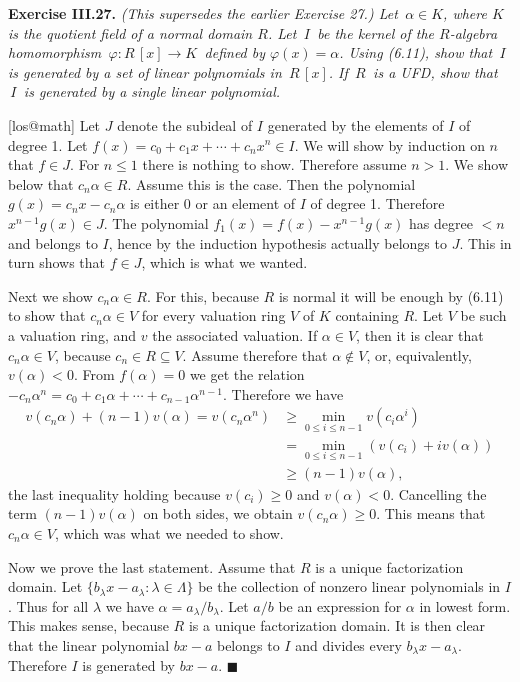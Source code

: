 \documentclass{article}
\makeatletter
\newcommand\<{\triangleleft}
\newenvironment{exercise}[1]{\gdef\currentEx{#1}\begin{trivlist}\item[]%
                \textbf{Exercise #1.} \it}{\end{trivlist}}
\newenvironment{solution}[1]{\def\x{#1}\begin{trivlist}\item[]\hspace*{-.5em}[\x]}
                {\hspace*{\fill} $\blacksquare$
                \protected@write0{}{\currentEx, \x}
                \end{trivlist}}
\makeatother
\begin{document}
 \begin{exercise}{III.27}
   (This supersedes the earlier Exercise 27.) Let $\,\alpha\in K$, where $K$ is the
   quotient field of a normal domain $R$. Let $\,I\,$ be the kernel of the $R$-algebra
   homomorphism $\,\varphi:R\,[x]\rightarrow K\,$ defined by $\varphi(x) =\alpha$.  Using
   (6.11), show that $\,I\,$ is generated by a set of linear polynomials in $\,R\,[x]$.
   If $\,R\,$ is a UFD, show that $\,I\,$ is generated by a single linear polynomial.
 \end{exercise}
 \begin{solution}{los@math}
   Let $J$ denote the subideal of $I$ generated by the elements of $I$ of degree 1. Let
   $f(x) = c_0 + c_1x + \cdots + c_nx^n \in I$. We will show by induction on $n$ that $f
   \in J$. For $n \leq 1$ there is nothing to show. Therefore assume $n > 1$. We  show
   below that $c_n{\alpha} \in R$. Assume this is the case. Then the polynomial $g(x) =
   c_nx-c_n\alpha$ is either 0 or an element of $I$ of degree 1. Therefore $x^{n-1}g(x)
   \in J$. The polynomial $f_1(x)=f(x) - x^{n-1}g(x)$ has degree $<n$ and belongs to $I$,
   hence by the induction hypothesis actually belongs to $J$. This in turn shows that $f
   \in J$, which is what we wanted.

   Next we show $c_n\alpha \in R$. For this, because $R$ is normal it will be enough by
   (6.11) to show that $c_n\alpha \in V$ for every valuation ring $V$ of $K$ containing
   $R$. Let $V$ be such a valuation ring, and $v$ the associated valuation. If $\alpha
   \in V$, then it is clear that $c_n\alpha \in V$, because $c_n \in R \subseteq V$.
   Assume therefore that $\alpha \notin V$, or, equivalently, $v(\alpha) < 0$. From
   $f(\alpha)=0$ we get the relation $-c_n{\alpha}^n =  c_0 + c_1\alpha + \cdots +
   c_{n-1}{\alpha}^{n-1}$. Therefore we have
   \begin{align*}
   v(c_n\alpha) + (n-1)v(\alpha) = v(c_n{\alpha}^n)
   &\geq \min_{0 \leq i \leq n-1}{v(c_i{\alpha}^i)} \\
   &= \min_{0 \leq i \leq n-1}{(v(c_i) + iv(\alpha))} \\
   &\geq (n-1)v(\alpha),
   \end{align*}
   the last inequality holding because $v(c_i) \geq 0$ and $v(\alpha) < 0$. Cancelling
   the term $(n-1)v(\alpha)$ on both sides, we obtain $v(c_n{\alpha}) \geq 0$. This means
   that $c_n\alpha \in V$, which was what we needed to show.

   Now we prove the last statement. Assume that $R$ is a unique factorization domain. Let
   $\{b_{\lambda}x - a_{\lambda} : \lambda \in \Lambda\}$ be the collection of nonzero
   linear polynomials in $I$. Thus for all $\lambda$ we have $\alpha =
   a_{\lambda}/b_{\lambda}$. Let $a/b$ be an expression for $\alpha$ in lowest form. This
   makes sense, because $R$ is a unique factorization domain. It is then clear that the
   linear polynomial $bx-a$ belongs to $I$ and divides every $b_{\lambda}x -
   a_{\lambda}$. Therefore $I$ is generated by $bx-a$.
 \end{solution}
\end{document}
